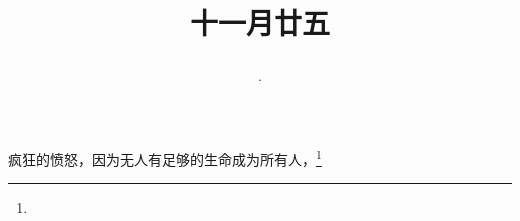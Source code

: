 \title{\date[d=25,m=12,y=2024][year:cn-y,年,month:cn,day:cn,日,·,weekday]·十一月廿五 }
疯狂的愤怒，因为无人有足够的生命成为所有人，\footnote{ }

